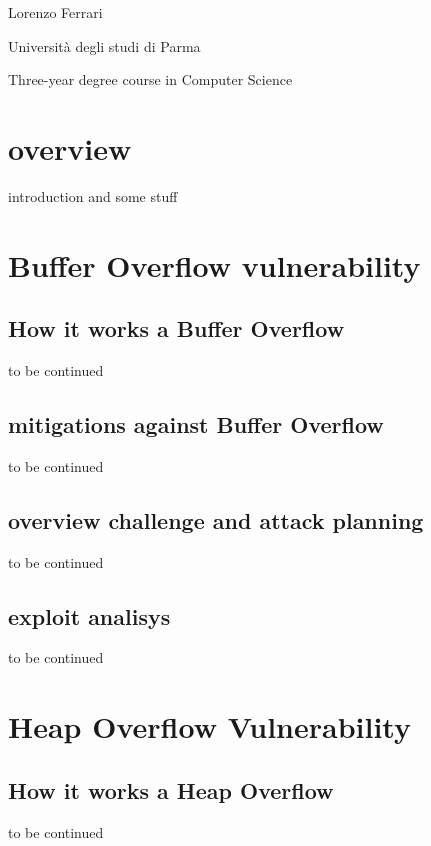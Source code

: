 \documentclass{report}
\begin{document}
\begin{titlepage}
    \centering
    \vspace*{\fill}
    \Huge \textbf{ }
    \vspace{2cm} 
    
    \Large Lorenzo Ferrari

    \vspace{2cm} 
    
    \Large Università degli studi di Parma
    \par
    Three-year degree course in Computer Science
    
 
\end{titlepage}

\renewcommand{\contentsname}{Index}
\tableofcontents



\chapter{overview}
introduction and some stuff
\chapter{Buffer Overflow vulnerability}
\section{How it works a Buffer Overflow}
to be continued
\section{mitigations against Buffer Overflow}
to be continued
\section{overview challenge and attack planning}
to be continued
\section{exploit analisys}
to be continued


\chapter{Heap Overflow Vulnerability}
\section{How it works a Heap Overflow}
to be continued
\end{document}
